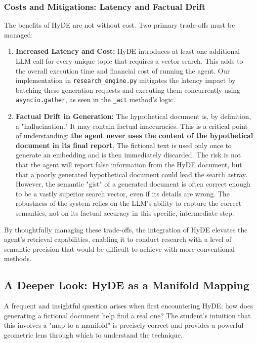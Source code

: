\documentclass[12pt, a4paper]{article}
\begin{document}
\subsubsection{Costs and Mitigations: Latency and Factual Drift}
The benefits of HyDE are not without cost. Two primary trade-offs must be managed:
\begin{enumerate}
    \item \textbf{Increased Latency and Cost:} HyDE introduces at least one additional LLM call for every unique topic that requires a vector search. This adds to the overall execution time and financial cost of running the agent. Our implementation in \verb|research_engine.py| mitigates the latency impact by batching these generation requests and executing them concurrently using \texttt{asyncio.gather}, as seen in the \texttt{\_act} method's logic.
    \item \textbf{Factual Drift in Generation:} The hypothetical document is, by definition, a "hallucination." It may contain factual inaccuracies. This is a critical point of understanding: \textbf{the agent never uses the content of the hypothetical document in its final report}. The fictional text is used only once to generate an embedding and is then immediately discarded. The risk is not that the agent will report false information from the HyDE document, but that a poorly generated hypothetical document could lead the search astray. However, the semantic "gist" of a generated document is often correct enough to be a vastly superior search vector, even if its details are wrong. The robustness of the system relies on the LLM's ability to capture the correct semantics, not on its factual accuracy in this specific, intermediate step.
\end{enumerate}

By thoughtfully managing these trade-offs, the integration of HyDE elevates the agent's retrieval capabilities, enabling it to conduct research with a level of semantic precision that would be difficult to achieve with more conventional methods.

\subsection{A Deeper Look: HyDE as a Manifold Mapping}
A frequent and insightful question arises when first encountering HyDE: how does generating a fictional document help find a real one? The student's intuition that this involves a "map to a manifold" is precisely correct and provides a powerful geometric lens through which to understand the technique.
\end{document}
